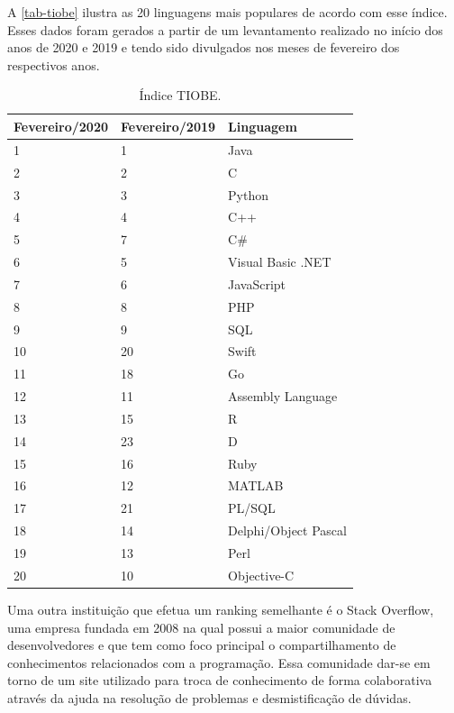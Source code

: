 A \autoref{tab-tiobe} ilustra as 20 linguagens mais populares de acordo com esse índice. Esses dados foram gerados a partir de um levantamento realizado no início dos anos de 2020 e 2019 e tendo sido divulgados nos meses de fevereiro dos respectivos anos.

\begin{table}[htb]
\ABNTEXfontereduzida
\caption[Índice TIOBE]{Índice TIOBE.}
\label{tab-tiobe}
\begin{tabular}{p{2.6cm}|p{2.6cm}|p{4cm}}
   \textbf{Fevereiro/2020} & \textbf{Fevereiro/2019}  & \textbf{Linguagem}  \\
    \hline
    1 & 1 & Java \\
    \hline
    2 & 2 & C \\
    \hline
    3 & 3 & Python \\
    \hline
    4 & 4 & C++ \\
    \hline
    5 & 7 & C\# \\
    \hline
    6 & 5 & Visual Basic .NET \\
    \hline
    7 & 6 & JavaScript \\
    \hline
    8 & 8 & PHP \\
    \hline
    9 & 9 & SQL \\
    \hline
    10 & 20 & Swift \\
    \hline
    11 & 18 & Go \\
    \hline
    12 & 11 & Assembly Language \\
    \hline
    13 & 15 & R \\
    \hline
    14 & 23 & D \\
    \hline
    15 & 16 & Ruby \\
    \hline
    16 & 12 & MATLAB \\
    \hline
    17 & 21 & PL/SQL \\
    \hline
    18 & 14 & Delphi/Object Pascal \\
    \hline
    19 & 13 & Perl \\
    \hline
    20 & 10 & Objective-C \\
\end{tabular}
\end{table}

\newpage
Uma outra instituição que efetua um ranking semelhante é o Stack Overflow\cite{stackOverflowAbout}, uma empresa fundada em 2008 na qual possui a maior comunidade de desenvolvedores e que tem como foco principal o compartilhamento de conhecimentos relacionados com a programação. Essa comunidade dar-se em torno de um site utilizado para troca de conhecimento de forma colaborativa através da ajuda na resolução de problemas e desmistificação de dúvidas.

